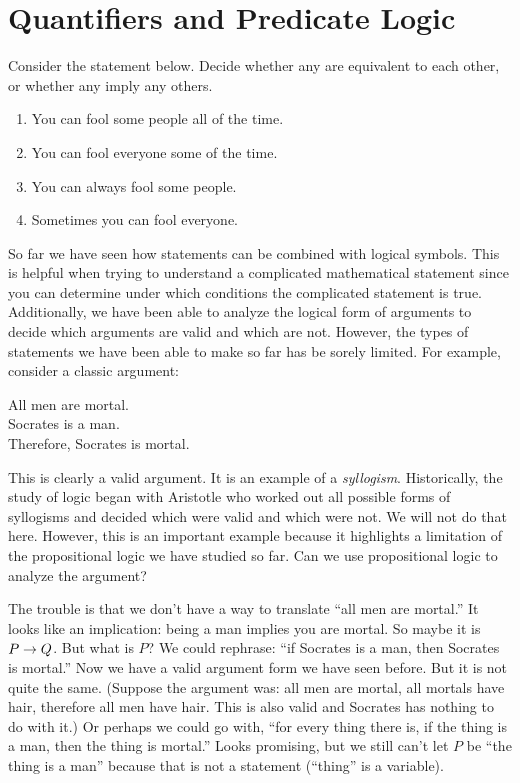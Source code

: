 \documentclass[12pt]{article}
\begin{document}
\section{Quantifiers and Predicate Logic}


\begin{activity}
Consider the statement below.  Decide whether any are equivalent to each other, or whether any imply any others.

\begin{enumerate}
\item You can fool some people all of the time.
\item You can fool everyone some of the time.
\item You can always fool some people.
\item Sometimes you can fool everyone.
\end{enumerate}

\end{activity}

So far we have seen how statements can be combined with logical symbols.  This is helpful when trying to understand a complicated mathematical statement since you can determine under which conditions the complicated statement is true.  Additionally, we have been able to analyze the logical form of arguments to decide which arguments are valid and which are not.  However, the types of statements we have been able to make so far has be sorely limited.  For example, consider a classic argument:

\begin{center}
 All men are mortal.\\ Socrates is a man. \\
 Therefore, Socrates is mortal.
\end{center}

This is clearly a valid argument.  It is an example of a \emph{syllogism}.  Historically, the study of logic began with Aristotle who worked out all possible forms of syllogisms and decided which were valid and which were not.  We will not do that here.  However, this is an important example because it highlights a limitation of the propositional logic we have studied so far.  Can we use propositional logic to analyze the argument?

The trouble is that we don't have a way to translate ``all men are mortal.''  It looks like an implication: being a man implies you are mortal.  So maybe it is $P \rightarrow Q$.  But what is $P$?  We could rephrase: ``if Socrates is a man, then Socrates is mortal.''  Now we have a valid argument form we have seen before.  But it is not quite the same.  (Suppose the argument was: all men are mortal, all mortals have hair, therefore all men have hair.  This is also valid and Socrates has nothing to do with it.)  Or perhaps we could go with, ``for every thing there is, if the thing is a man, then the thing is mortal.''  Looks promising, but we still can't let $P$ be ``the thing is a man'' because that is not a statement (``thing'' is a variable).
\end{document}
